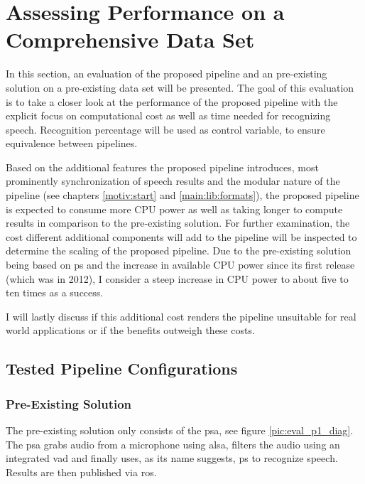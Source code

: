 

\section{Assessing Performance on a Comprehensive Data Set}
\label{eval:dataset}

In this section, an evaluation of the proposed pipeline and an pre-existing solution on a pre-existing data set will be presented.
The goal of this evaluation is to take a closer look at the performance of the proposed pipeline with the explicit focus on computational cost as well as time needed for recognizing speech.
Recognition percentage will be used as control variable, to ensure equivalence between pipelines.

Based on the additional features the proposed pipeline introduces, most prominently synchronization of speech results and the modular nature of the pipeline (see chapters \ref{motiv:start} and \ref{main:lib:formats}), the proposed pipeline is expected to consume more CPU power as well as taking longer to compute results in comparison to the pre-existing solution.
For further examination, the cost different additional components will add to the pipeline will be inspected to determine the scaling of the proposed pipeline.
Due to the pre-existing solution being based on \gls{ps} and the increase in available CPU power since its first release (which was in 2012), I consider a steep increase in CPU power to about five to ten times as a success.


I will lastly discuss if this additional cost renders the pipeline unsuitable for real world applications or if the benefits outweigh these costs.


\subsection{Tested Pipeline Configurations} %

\subsubsection{Pre-Existing Solution}

The pre-existing solution only consists of the \gls{psa}, see figure \ref{pic:eval_p1_diag}.
The \gls{psa} grabs audio from a microphone using \gls{alsa}, filters the audio using an integrated \gls{vad} and finally uses, as its name suggests, \gls{ps} to recognize speech.
Results are then published via \gls{ros}.

